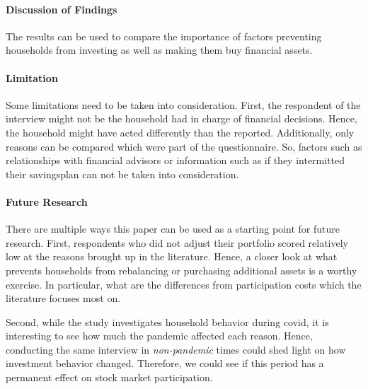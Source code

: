 \documentclass[ProjectABM]{subfiles}
\begin{document}
\paragraph{Discussion of Findings}
The results can be used to compare the importance of factors preventing households from investing as well as making them buy financial assets.

\paragraph{Limitation}
Some limitations need to be taken into consideration. First, the respondent of the interview might not be the household had in charge of financial decisions. Hence, the household might have acted differently than the reported. Additionally, only reasons can be compared which were part of the questionnaire. So, factors such as relationships with financial advisors or information such as if they intermitted their savingsplan can not be taken into consideration.


\paragraph{Future Research}
There are multiple ways this paper can be used as a starting point for future research. First, respondents who did not adjust their portfolio scored relatively low at the reasons brought up in the literature. Hence, a closer look at what prevents households from rebalancing or purchasing additional assets is a worthy exercise. In particular, what are the differences from participation costs which the literature focuses most on.

Second, while the study investigates household behavior during covid, it is interesting to see how much the pandemic affected each reason. Hence, conducting the same interview in \textit{non-pandemic} times could shed light on how investment behavior changed. Therefore, we could see if this period has a permanent effect on stock market participation.



\onlyinsubfile{}
%
\end{document}
